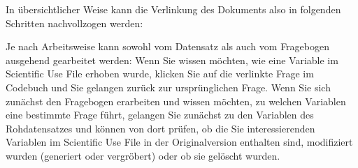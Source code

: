 In übersichtlicher Weise kann die Verlinkung des Dokuments also in folgenden Schritten nachvollzogen werden:\vspace*{0.5cm}


Je nach Arbeitsweise kann sowohl vom Datensatz als auch vom Fragebogen ausgehend gearbeitet werden: Wenn Sie wissen möchten, wie eine Variable im Scientific Use File erhoben wurde, klicken Sie auf die verlinkte Frage im Codebuch und Sie gelangen zurück zur ursprünglichen Frage. Wenn Sie sich zunächst den Fragebogen erarbeiten und wissen möchten, zu welchen Variablen eine bestimmte Frage führt, gelangen Sie zunächst zu den Variablen des Rohdatensatzes und können von dort prüfen, ob die Sie interessierenden Variablen im Scientific Use File in der Originalversion enthalten sind, modifiziert wurden (generiert oder vergröbert) oder ob sie gelöscht wurden. 
